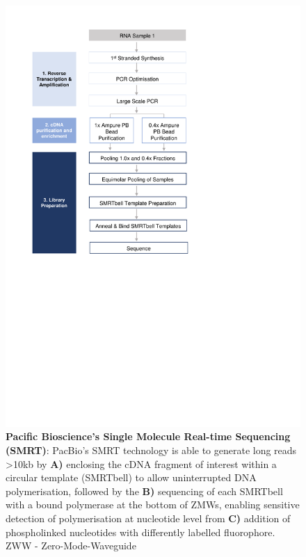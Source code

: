 \begin{figure}[!h]
	\centering
	\includegraphics[page=14,trim={0 5cm 0 0 },clip, scale = 0.7]{Figures/ProjectDevelopment_Figures.pdf}
	\captionsetup{width=0.95\textwidth}
	\caption[Pacific Bioscience's Single Molecule Real-time Sequencing]%
	{\textbf{Pacific Bioscience's Single Molecule Real-time Sequencing (SMRT)}: PacBio's SMRT technology is able to generate long reads >10kb by \textbf{A)} enclosing the cDNA fragment of interest within a circular template (SMRTbell) to allow uninterrupted DNA polymerisation,  followed by the \textbf{B)} sequencing of each SMRTbell with a bound polymerase at the bottom of ZMWs, enabling sensitive detection of polymerisation at nucleotide level from \textbf{C)} addition of phospholinked nucleotides with differently labelled fluorophore. ZWW - Zero-Mode-Waveguide}
	\label{fig:Mechanism}
\end{figure}


